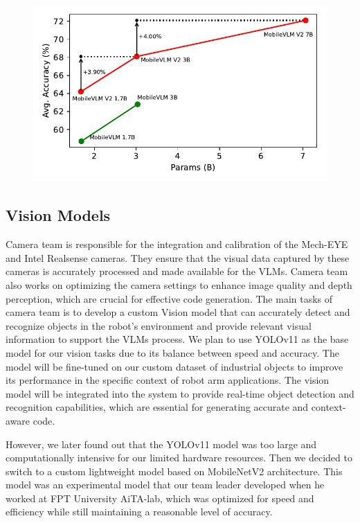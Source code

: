 \documentclass[conference]{IEEEtran}
\begin{document}
\begin{figure}[ht]
  \centering
   \includegraphics[width=.87\columnwidth]{figures/mobilevlm_scaling.pdf}
   \label{fig:model-scaling}
\end{figure}

\newpage

\subsection{Vision Models}

Camera team is responsible for the integration and calibration of the Mech-EYE and Intel Realsense cameras. 
They ensure that the visual data captured by these cameras is accurately processed and made available for the VLMs.
Camera team also works on optimizing the camera settings to enhance image quality and depth perception, which are crucial for effective code generation.
The main tasks of camera team is to develop a custom Vision model that can accurately detect and recognize objects in the robot's environment and provide relevant visual information to support the VLMs process.
We plan to use YOLOv11\cite{yolo11_ultralytics} as the base model for our vision tasks due to its balance between speed and accuracy. The model will be fine-tuned on our custom dataset of industrial objects to improve its performance in the specific context of robot arm applications.
The vision model will be integrated into the system to provide real-time object detection and recognition capabilities, which are essential for generating accurate and context-aware code.

However, we later found out that the YOLOv11 model was too large and computationally intensive for our limited hardware resources. Then we decided to switch to a custom lightweight model based on MobileNetV2\cite{sandler2018mobilenetv2} architecture.
This model was an experimental model that our team leader developed when he worked at FPT University AiTA-lab\cite{aita_lab}, which was optimized for speed and efficiency while still maintaining a reasonable level of accuracy.
\end{document}
